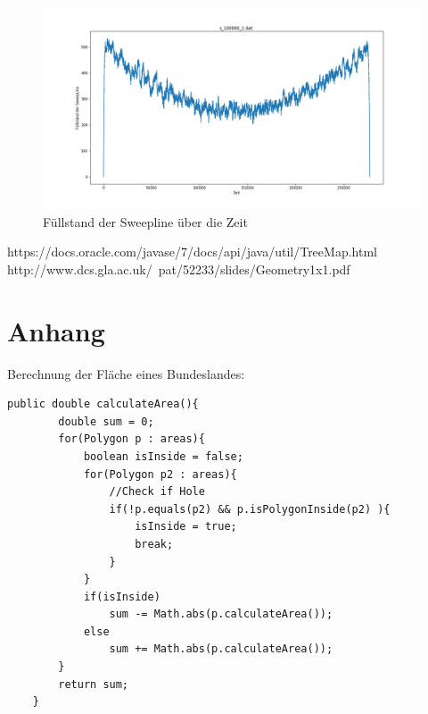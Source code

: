 \documentclass[conference]{IEEEtran}
\begin{document}
\begin{figure}[!tbp]
\begin{minipage}[b]{0.5\textwidth}
		\end{minipage}
			\hfill
		\begin{minipage}[b]{0.5\textwidth}
			\includegraphics[width=\textwidth]{s100000+1.png}
		\end{minipage}
		\caption{Füllstand der Sweepline über die Zeit}
	\end{figure}
	
	\begin{thebibliography}{00}
		https://docs.oracle.com/javase/7/docs/api/java/util/TreeMap.html
		http://www.dcs.gla.ac.uk/~pat/52233/slides/Geometry1x1.pdf
	\end{thebibliography}
	
	
	
	\section{Anhang}

	Berechnung der Fläche eines Bundeslandes:
	\begin{lstlisting}[basicstyle=\tiny]
	public double calculateArea(){
		double sum = 0;
		for(Polygon p : areas){
			boolean isInside = false;
			for(Polygon p2 : areas){
				//Check if Hole
				if(!p.equals(p2) && p.isPolygonInside(p2) ){ 
					isInside = true;
					break;
				}   
			}
			if(isInside)
				sum -= Math.abs(p.calculateArea());
			else
				sum += Math.abs(p.calculateArea());
		}
		return sum;
	}
	\end{lstlisting}	
\end{document}
